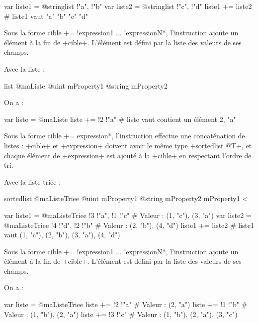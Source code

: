 \begin{galgas}
var liste1 = @stringlist {!"a", !"b"}
var liste2 = @stringlist {!"c", !"d"}
liste1 += liste2 # liste1 vaut "a" "b" "c" "d"
\end{galgas}



Sous la forme \ggs*cible += !expression1 ... !expressionN*, l'instruction ajoute un élément à la fin de \ggs+cible+. L'élément est défini par la liste des valeurs de ses champs.

Avec la liste :
\begin{galgas}
list @maListe {
  @uint mProperty1
  @string mProperty2
}
\end{galgas}

On a :

\begin{galgas}
var liste = @maListe {}
liste += !2 !"a" # liste vaut contient un élément 2, "a"
\end{galgas}







Sous la forme \ggs*cible += expression*, l'instruction effectue une concaténation de listes : \ggs+cible+ et \ggs+expression+ doivent avoir le même type \ggs+sortedlist @T+, et chaque élément de \ggs+expression+ est ajouté à la \ggs+cible+ en respectant l'ordre de tri.

Avec la liste triée :
\begin{galgas}
sortedlist @maListeTriee {
  @uint mProperty1
  @string mProperty2
}{
  mProperty1 <
}
\end{galgas}

\begin{galgas}
var liste1 = @maListeTriee {!3 !"a", !1 !"c"} # Valeur : (1, "c"), (3, "a")
var liste2 = @maListeTriee {!4 !"d", !2 !"b"} # Valeur : (2, "b"), (4, "d")
liste1 += liste2 # liste1 vaut (1, "c"), (2, "b"), (3, "a"), (4, "d")
\end{galgas}



Sous la forme \ggs*cible += !expression1 ... !expressionN*, l'instruction ajoute un élément à la fin de \ggs+cible+. L'élément est défini par la liste des valeurs de ses champs.


On a :

\begin{galgas}
var liste = @maListeTriee {}
liste += !2 !"a" # Valeur : (2, "a")
liste += !1 !"b" # Valeur : (1, "b"), (2, "a")
liste += !3 !"c" # Valeur : (1, "b"), (2, "a"), (3, "c")
\end{galgas}







